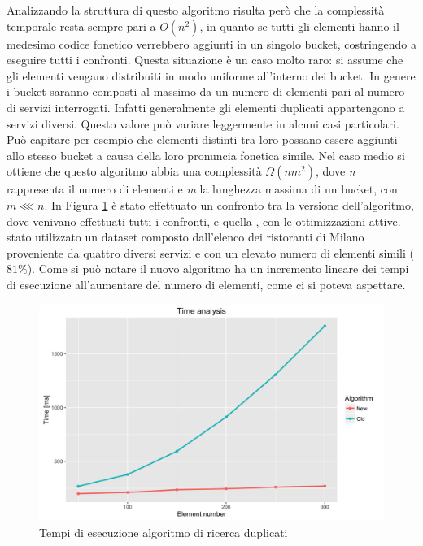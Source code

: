 Analizzando la struttura di questo algoritmo risulta però che la complessità temporale resta sempre pari a $ O(n^2) $, in quanto se tutti gli elementi hanno il medesimo codice fonetico verrebbero aggiunti in un singolo bucket, costringendo a eseguire tutti i confronti. Questa situazione è un caso molto raro: si assume che gli elementi vengano distribuiti in modo uniforme all'interno dei bucket. In genere i bucket saranno composti al massimo da un numero di elementi pari al numero di servizi interrogati. Infatti generalmente gli elementi duplicati appartengono a servizi diversi. Questo valore può variare leggermente in alcuni casi particolari. Può capitare per esempio che elementi distinti tra loro possano essere aggiunti allo stesso bucket a causa della loro pronuncia fonetica simile. Nel caso medio si ottiene che questo algoritmo abbia una complessità $ \Omega(nm^2) $, dove \emph{n} rappresenta il numero di elementi e \emph{m} la lunghezza massima di un bucket, con $ m \lll n $. In Figura \ref{fig:tempo-esecuzione-algoritmo-duplicati} è stato effettuato un confronto tra la versione  dell'algoritmo, dove venivano effettuati tutti i confronti, e quella , con le ottimizzazioni attive. \upe stato utilizzato un dataset composto dall'elenco dei ristoranti di Milano proveniente da quattro diversi servizi e con un elevato numero di elementi simili ($ 81\% $). Come si può notare il nuovo algoritmo ha un incremento lineare dei tempi di esecuzione all'aumentare del numero di elementi, come ci si poteva aspettare.

\begin{figure}[ht]
	\centering
	\includegraphics[width=\textwidth]{4-metodologia/Immagini/similarity_time_analysis.png}
	\caption{Tempi di esecuzione algoritmo di ricerca duplicati}\label{fig:tempo-esecuzione-algoritmo-duplicati}
\end{figure}

